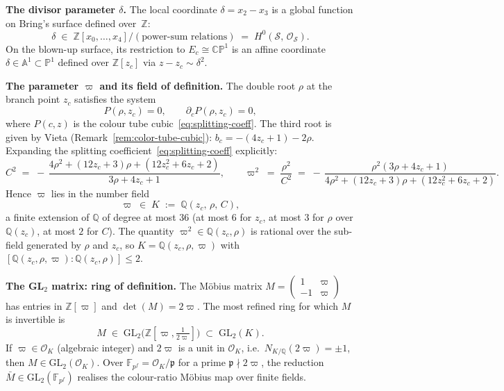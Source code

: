 \begin{remark}
\label{rem:mobius-arithmetic}

\noindent\textbf{The divisor parameter $\delta$.}\;
The local coordinate $\delta = x_2 - x_3$ is a global function on
Bring's surface defined over~$\mathbb{Z}$:
\[
  \delta \;\in\;
  \mathbb{Z}[x_0,\ldots,x_4]\big/(\text{power-sum relations})
  \;=\; H^0(\mathcal{S},\,\mathcal{O}_{\mathcal{S}}).
\]
On the blown-up surface, its restriction to $E_c\cong\mathbb{CP}^1$
is an affine coordinate $\delta\in\mathbb{A}^1\subset\mathbb{P}^1$
defined over $\mathbb{Z}[z_c]$ via $z-z_c\sim\delta^2$.

\medskip
\noindent\textbf{The parameter $\varpi$ and its field of definition.}\;
The double root $\rho$ at the branch point $z_c$ satisfies the
system
\begin{equation}\label{eq:double-root-system}
  P(\rho,z_c)=0, \qquad \partial_c P(\rho,z_c)=0,
\end{equation}
where $P(c,z)$ is the colour tube cubic~\eqref{eq:splitting-coeff}.
The third root is given by Vieta (Remark~\ref{rem:color-tube-cubic}):
$b_c = -(4z_c+1)-2\rho$.
Expanding the splitting coefficient~\eqref{eq:splitting-coeff} explicitly:
\begin{equation}\label{eq:splitting-explicit}
  C^2 \;=\; -\,\frac{4\rho^2+(12z_c+3)\rho+(12z_c^2+6z_c+2)}{3\rho+4z_c+1},
  \qquad
  \varpi^2 \;=\; \frac{\rho^2}{C^2}
  \;=\; -\,\frac{\rho^2(3\rho+4z_c+1)}{4\rho^2+(12z_c+3)\rho+(12z_c^2+6z_c+2)}.
\end{equation}
Hence $\varpi$ lies in the number field
\begin{equation}\label{eq:varpi-field}
  \varpi \;\in\;
  K \;:=\; \mathbb{Q}(z_c,\,\rho,\,C),
\end{equation}
a finite extension of $\mathbb{Q}$ of degree at most $36$
(at most $6$ for $z_c$, at most $3$ for $\rho$ over $\mathbb{Q}(z_c)$,
at most $2$ for $C$).  The quantity $\varpi^2 \in \mathbb{Q}(z_c,\rho)$
is rational over the sub-field generated by $\rho$ and $z_c$, so
$K = \mathbb{Q}(z_c,\rho,\varpi)$ with $[\mathbb{Q}(z_c,\rho,\varpi)
  :\mathbb{Q}(z_c,\rho)]\leq 2$.

\medskip
\noindent\textbf{The GL$_2$ matrix: ring of definition.}\;
The M\"obius matrix
$M = \begin{pmatrix}1&\varpi\\-1&\varpi\end{pmatrix}$
has entries in $\mathbb{Z}[\varpi]$ and $\det(M) = 2\varpi$.
The most refined ring for which $M$ is invertible is
\begin{equation}\label{eq:mobius-matrix-ring}
  M \;\in\;
  \mathrm{GL}_2\!\bigl(\mathbb{Z}[\varpi,\tfrac{1}{2\varpi}]\bigr)
  \;\subset\; \mathrm{GL}_2(K).
\end{equation}
If $\varpi\in\mathcal{O}_K$ (algebraic integer) and $2\varpi$ is a
unit in $\mathcal{O}_K$, i.e.\ $N_{K/\mathbb{Q}}(2\varpi)=\pm 1$,
then $M\in\mathrm{GL}_2(\mathcal{O}_K)$.  Over
$\mathbb{F}_{p^f} = \mathcal{O}_K/\mathfrak{p}$ for a prime
$\mathfrak{p}\nmid 2\varpi$, the reduction
$\bar{M}\in\mathrm{GL}_2(\mathbb{F}_{p^f})$ realises the colour-ratio
M\"obius map over finite fields.


\end{remark}
